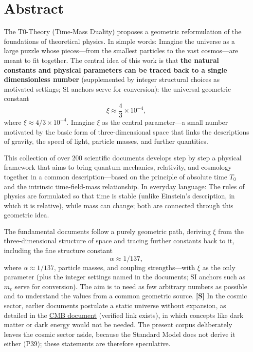 \section*{Abstract}
	The T0-Theory (Time-Mass Duality) proposes a geometric reformulation of the foundations of theoretical physics. In simple words: Imagine the universe as a large puzzle whose pieces—from the smallest particles to the vast cosmos—are meant to fit together. The central idea of this work is that \textbf{the natural constants and physical parameters can be traced back to a single dimensionless number} (supplemented by integer structural choices as motivated settings; SI anchors serve for conversion): the universal geometric constant 
	\[
	\xi \approx \frac{4}{3} \times 10^{-4},
	\]
	where $\xi \approx 4/3 \times 10^{-4}$. Imagine $\xi$ as the central parameter—a small number motivated by the basic form of three-dimensional space that links the descriptions of gravity, the speed of light, particle masses, and further quantities.
	
	This collection of over 200 scientific documents develops step by step a physical framework that aims to bring quantum mechanics, relativity, and cosmology together in a common description—based on the principle of absolute time $T_0$ and the intrinsic time-field-mass relationship. In everyday language: The rules of physics are formulated so that time is stable (unlike Einstein's description, in which it is relative), while mass can change; both are connected through this geometric idea. 
	
	The fundamental documents follow a purely geometric path, deriving $\xi$ from the three-dimensional structure of space and tracing further constants back to it, including the fine structure constant 
	\[
	\alpha \approx 1/137,
	\]
	where $\alpha \approx 1/137$, particle masses, and coupling strengths—with $\xi$ as the only parameter (plus the integer settings named in the documents; SI anchors such as $m_e$ serve for conversion). The aim is to need as few arbitrary numbers as possible and to understand the values from a common geometric source. \textbf{[S]} In the cosmic sector, earlier documents postulate a static universe without expansion, as detailed in the \href{https://github.com/jpascher/T0-Time-Mass-Duality/blob/main/2/pdf/140_T0_CMB_Donoghue_Analyse_En.pdf}{CMB document} (verified link exists), in which concepts like dark matter or dark energy would not be needed. The present corpus deliberately leaves the cosmic sector aside, because the Standard Model does not derive it either (P39); these statements are therefore speculative.
	
